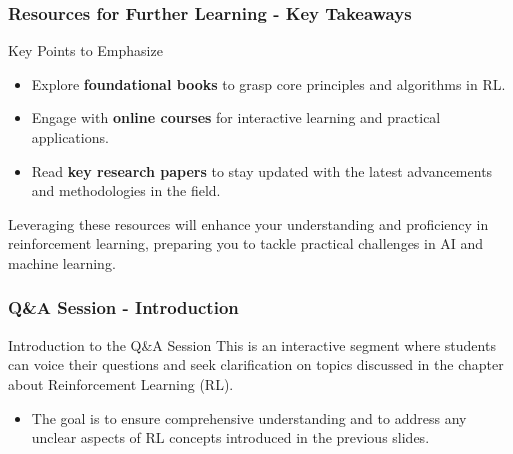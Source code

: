 \documentclass[aspectratio=169]{beamer}
\begin{document}
\begin{frame}[fragile]
    \frametitle{Resources for Further Learning - Key Takeaways}
    \begin{block}{Key Points to Emphasize}
        \begin{itemize}
            \item Explore \textbf{foundational books} to grasp core principles and algorithms in RL.
            \item Engage with \textbf{online courses} for interactive learning and practical applications.
            \item Read \textbf{key research papers} to stay updated with the latest advancements and methodologies in the field.
        \end{itemize}
    \end{block}
    
    Leveraging these resources will enhance your understanding and proficiency in reinforcement learning, preparing you to tackle practical challenges in AI and machine learning.
\end{frame}

\begin{frame}[fragile]
    \frametitle{Q\&A Session - Introduction}
    \begin{block}{Introduction to the Q\&A Session}
        This is an interactive segment where students can voice their questions and seek clarification on topics discussed in the chapter about Reinforcement Learning (RL).
        \begin{itemize}
            \item The goal is to ensure comprehensive understanding and to address any unclear aspects of RL concepts introduced in the previous slides.
        \end{itemize}
    \end{block}
\end{frame}
\end{document}
